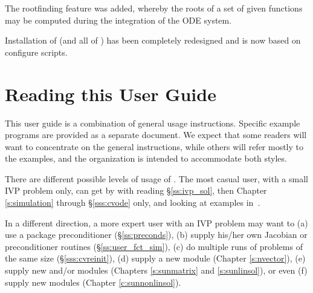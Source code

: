 The rootfinding feature was added, whereby the roots of a set of given
functions may be computed during the integration of the ODE system.

Installation of {\cvode} (and all of {\sundials}) has been completely
redesigned and is now based on configure scripts.


\section{Reading this User Guide}\label{ss:reading}

This user guide is a combination of general usage instructions.
Specific example programs are provided as a separate document.
We expect that some readers will want to
concentrate on the general instructions, while others will refer
mostly to the examples, and the organization is intended to
accommodate both styles.

There are different possible levels of usage of {\cvode}. The most
casual user, with a small IVP problem only, can get by with reading
\S\ref{ss:ivp_sol}, then Chapter \ref{s:simulation} through
\S\ref{sss:cvode} only, and looking at examples in~\cite{cvode_ex}.

In a different direction, a more expert user with an IVP problem may want to
(a) use a package preconditioner (\S\ref{ss:preconds}),
(b) supply his/her own Jacobian or preconditioner routines (\S\ref{ss:user_fct_sim}),
(c) do multiple runs of problems of the same size (\S\ref{sss:cvreinit}),
(d) supply a new {\nvector} module (Chapter \ref{s:nvector}),
(e) supply new {\sunlinsol} and/or {\sunmatrix} modules (Chapters
\ref{s:sunmatrix} and \ref{s:sunlinsol}), or even
(f) supply new {\sunnonlinsol} modules (Chapter \ref{c:sunnonlinsol}).

